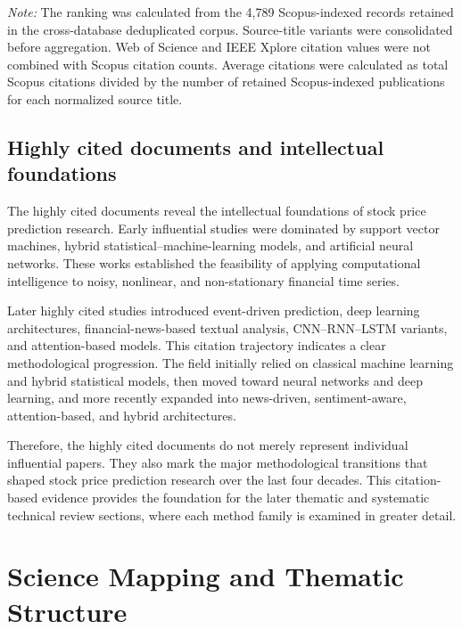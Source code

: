 \documentclass[pdflatex,sn-mathphys-num]{sn-jnl}%
\theoremstyle{thmstyleone}%
\theoremstyle{thmstyletwo}%
\theoremstyle{thmstylethree}%
\begin{document}
\begin{table}[!t]
\begin{tabular}{@{}rlrrr@{}}
\bottomrule
\end{tabular}

\vspace{3pt}
\begin{minipage}{0.97\textwidth}
\footnotesize
\textit{Note:} The ranking was calculated from the 4,789
Scopus-indexed records retained in the cross-database deduplicated
corpus. Source-title variants were consolidated before aggregation.
Web of Science and IEEE Xplore citation values were not combined
with Scopus citation counts. Average citations were calculated as
total Scopus citations divided by the number of retained
Scopus-indexed publications for each normalized source title.
\end{minipage}
\end{table}
\FloatBarrier   



\subsection{Highly cited documents and intellectual foundations}

The highly cited documents reveal the intellectual foundations of stock price prediction research. Early influential studies were dominated by support vector machines, hybrid statistical--machine-learning models, and artificial neural networks. These works established the feasibility of applying computational intelligence to noisy, nonlinear, and non-stationary financial time series.

Later highly cited studies introduced event-driven prediction, deep learning architectures, financial-news-based textual analysis, CNN--RNN--LSTM variants, and attention-based models. This citation trajectory indicates a clear methodological progression. The field initially relied on classical machine learning and hybrid statistical models, then moved toward neural networks and deep learning, and more recently expanded into news-driven, sentiment-aware, attention-based, and hybrid architectures.

Therefore, the highly cited documents do not merely represent individual influential papers. They also mark the major methodological transitions that shaped stock price prediction research over the last four decades. This citation-based evidence provides the foundation for the later thematic and systematic technical review sections, where each method family is examined in greater detail.


\section{Science Mapping and Thematic Structure}
\label{sec:science-mapping}
\end{document}
